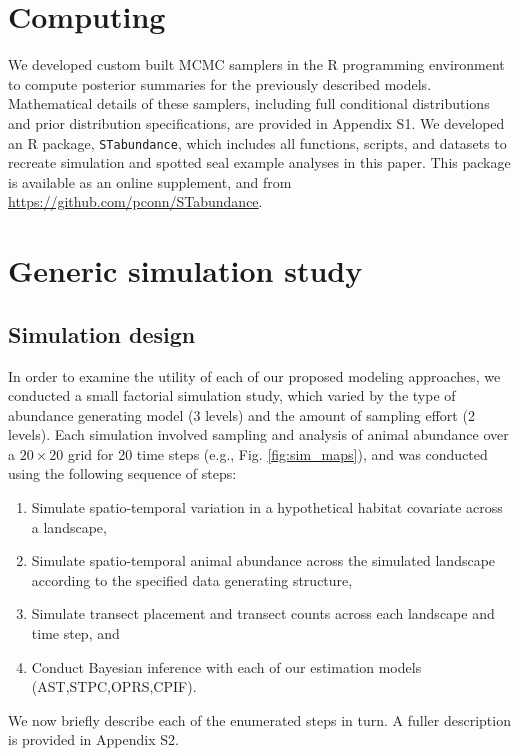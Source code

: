 \documentclass[12pt,english]{article}
\begin{document}
\begin{spacing}{1.9}
\section{Computing}

We developed custom built MCMC samplers in the R programming environment \citep{RTeam2013} to compute posterior summaries for the previously described models.  Mathematical details of these samplers, including full conditional distributions and prior distribution specifications, are provided in Appendix S1.  We developed an R package, \texttt{STabundance}, which includes all functions, scripts, and datasets to recreate simulation and spotted seal example analyses in this paper.  This package is available as an online supplement, and from \url{https://github.com/pconn/STabundance}.

\section{Generic simulation study}

\subsection{Simulation design}

In order to examine the utility of each of our proposed modeling approaches, we conducted a small factorial simulation study, which varied by the type of abundance generating model (3 levels) and the amount of sampling effort (2 levels).  Each simulation involved sampling and analysis of animal abundance over a $20 \times 20$ grid for 20 time steps (e.g., Fig. \ref{fig:sim_maps}), and was conducted using the following sequence of steps:
\begin{enumerate}
 \item Simulate spatio-temporal variation in a hypothetical habitat covariate across a landscape,
 \item Simulate spatio-temporal animal abundance across the simulated landscape according to the specified data generating structure,
 \item Simulate transect placement and transect counts across each landscape and time step, and
 \item Conduct Bayesian inference with each of our estimation models (AST,STPC,OPRS,CPIF).
\end{enumerate}
We now briefly describe each of the enumerated steps in turn.  A fuller description is provided in Appendix S2.


\end{spacing}
\end{document}
